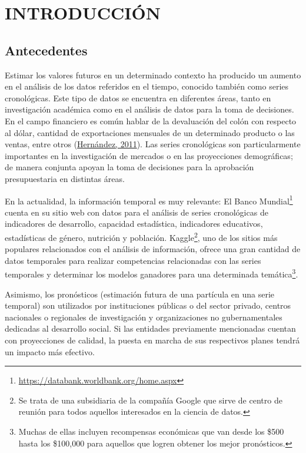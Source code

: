 \documentclass[
]{article}
\begin{document}
\newpage

\section{INTRODUCCIÓN}

\subsection{Antecedentes}

Estimar los valores futuros en un determinado contexto ha producido un
aumento en el análisis de los datos referidos en el tiempo, conocido
también como series cronológicas. Este tipo de datos se encuentra en
diferentes áreas, tanto en investigación académica como en el análisis
de datos para la toma de decisiones. En el campo financiero es común
hablar de la devaluación del colón con respecto al dólar, cantidad de
exportaciones mensuales de un determinado producto o las ventas, entre
otros (\protect\hyperlink{ref-oscarh-1}{Hernández, 2011}). Las series
cronológicas son particularmente importantes en la investigación de
mercados o en las proyecciones demográficas; de manera conjunta apoyan
la toma de decisiones para la aprobación presupuestaria en distintas
áreas.

En la actualidad, la información temporal es muy relevante: El Banco
Mundial\footnote{\url{https://databank.worldbank.org/home.aspx}} cuenta
en su sitio web con datos para el análisis de series cronológicas de
indicadores de desarrollo, capacidad estadística, indicadores
educativos, estadísticas de género, nutrición y población.
Kaggle\footnote{Se trata de una subsidiaria de la compañía Google que
  sirve de centro de reunión para todos aquellos interesados en la
  ciencia de datos.}, uno de los sitios más populares relacionados con
el análisis de información, ofrece una gran cantidad de datos temporales
para realizar competencias relacionadas con las series temporales y
determinar los modelos ganadores para una determinada
temática\footnote{Muchas de ellas incluyen recompensas económicas que
  van desde los \$500 hasta los \$100,000 para aquellos que logren
  obtener los mejor pronósticos.}.

Asimismo, los pronósticos (estimación futura de una partícula en una
serie temporal) son utilizados por instituciones públicas o del sector
privado, centros nacionales o regionales de investigación y
organizaciones no gubernamentales dedicadas al desarrollo social. Si las
entidades previamente mencionadas cuentan con proyecciones de calidad,
la puesta en marcha de sus respectivos planes tendrá un impacto más
efectivo.
\end{document}
